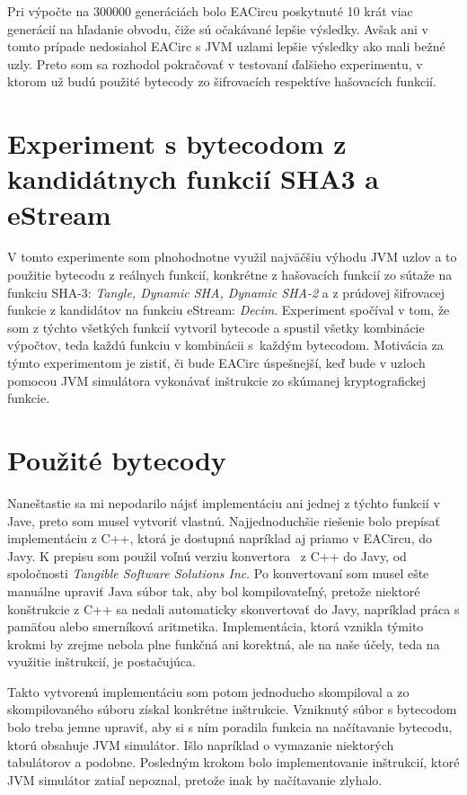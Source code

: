 Pri výpočte na 300000 generáciách bolo EACircu poskytnuté 10 krát viac generácií na hľadanie obvodu, čiže sú očakávané lepšie výsledky. Avšak ani v tomto prípade nedosiahol EACirc s JVM uzlami lepšie výsledky ako mali bežné uzly. Preto som sa rozhodol pokračovať v testovaní ďalšieho experimentu, v ktorom už budú použité bytecody zo šifrovacích respektíve hašovacích funkcií.

\section{Experiment s bytecodom z kandidátnych funkcií SHA3 a eStream}
\label{sec:exp2}

V tomto experimente som plnohodnotne využil najväčšiu výhodu JVM uzlov a to použitie bytecodu z reálnych funkcií, konkrétne z hašovacích funkcií zo sútaže na funkciu SHA-3: \textit{Tangle, Dynamic SHA, Dynamic SHA-2} a z prúdovej šifrovacej funkcie z kandidátov na funkciu eStream: \textit{Decim}. Experiment spočíval v tom, že som z týchto všetkých funkcií vytvoril bytecode a spustil všetky kombinácie výpočtov, teda každú funkciu v kombinácii s~každým bytecodom. Motivácia za týmto experimentom je zistiť, či bude EACirc úspešnejší, keď bude v uzloch pomocou JVM simulátora vykonávať inštrukcie zo skúmanej kryptografickej funkcie. 

\section{Použité bytecody}
\label{sec:exp2-bytecode}

Naneštastie sa mi nepodarilo nájsť implementáciu ani jednej z týchto funkcií v Jave, preto som musel vytvoriť vlastnú. Najjednoduchšie riešenie bolo prepísať implementáciu z C++, ktorá je dostupná napríklad aj priamo v EACircu, do Javy. K prepisu som použil voľnú verziu konvertora~\parencite{c++-java-converter} z C++ do Javy, od spoločnosti \textit{Tangible Software Solutions Inc}. Po konvertovaní som musel ešte manuálne upraviť Java súbor tak, aby bol kompilovateľný, pretože niektoré konštrukcie z C++ sa nedali automaticky skonvertovať do Javy, napríklad práca s pamäťou alebo smerníková aritmetika. Implementácia, ktorá vznikla týmito krokmi by zrejme nebola plne funkčná ani korektná, ale na naše účely, teda na využitie inštrukcií, je postačujúca. 

Takto vytvorenú implementáciu som potom jednoducho skompiloval a zo skompilovaného súboru získal konkrétne inštrukcie. Vzniknutý súbor s bytecodom bolo treba jemne upraviť, aby si s ním poradila funkcia na načítavanie bytecodu, ktorú obsahuje JVM simulátor. Išlo napríklad o vymazanie niektorých tabulátorov a podobne. Posledným krokom bolo implementovanie inštrukcií, ktoré JVM simulátor zatiaľ nepoznal, pretože inak by načítavanie zlyhalo.

